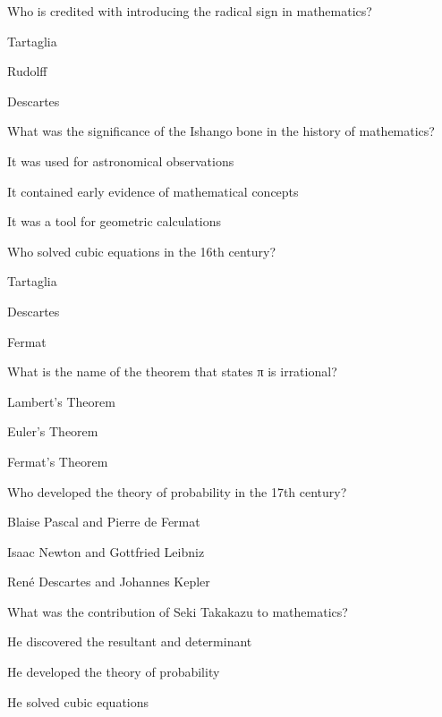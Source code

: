 
\begin{enhancedmcq}{Who is credited with introducing the radical sign in mathematics?}
\item Tartaglia
\item Rudolff
\item Descartes

\end{enhancedmcq}
\begin{enhancedmcq}{What was the significance of the Ishango bone in the history of mathematics?}
\item It was used for astronomical observations
\item It contained early evidence of mathematical concepts
\item It was a tool for geometric calculations

\end{enhancedmcq}
\begin{enhancedmcq}{Who solved cubic equations in the 16th century?}
\item Tartaglia
\item Descartes
\item Fermat

\end{enhancedmcq}
\begin{enhancedmcq}{What is the name of the theorem that states π is irrational?}
\item Lambert's Theorem
\item Euler's Theorem
\item Fermat's Theorem

\end{enhancedmcq}
\begin{enhancedmcq}{Who developed the theory of probability in the 17th century?}
\item Blaise Pascal and Pierre de Fermat
\item Isaac Newton and Gottfried Leibniz
\item René Descartes and Johannes Kepler

\end{enhancedmcq}
\begin{enhancedmcq}{What was the contribution of Seki Takakazu to mathematics?}
\item He discovered the resultant and determinant
\item He developed the theory of probability
\item He solved cubic equations

\end{enhancedmcq}
